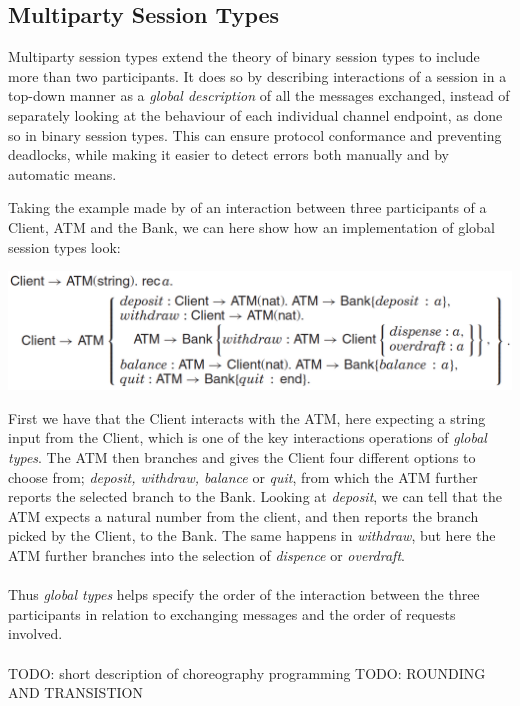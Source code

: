 
\subsection{Multiparty Session Types}
Multiparty session types extend the theory of binary session types to include more than two participants. It does so by describing interactions of a session in a top-down manner as a \textit{global description} of all the messages exchanged, instead of separately looking at the behaviour of each individual channel endpoint, as done so in binary session types. This can ensure protocol conformance and preventing deadlocks, while making it easier to detect errors both manually and by automatic means.  %

Taking the example made by \citeauthor{DBLP:journals/csur/HuttelLVCCDMPRT16} of an interaction between three participants of a Client, ATM and the Bank, we can here show how an implementation of global session types look:
\begin{center}
\includegraphics[width=1.0\textwidth, angle=0]{Graphics/Client_ATM.pdf}
\end{center}
First we have that the Client interacts with the ATM, here expecting a string input from the Client, which is one of the key interactions operations of \textit{global types}. The ATM then branches and gives the Client four different options to choose from; \textit{deposit, withdraw, balance} or \textit{quit}, from which the ATM further reports the selected branch to the Bank. Looking at \textit{deposit}, we can tell that the ATM expects a natural number from the client, and then reports the branch picked by the Client, to the Bank. The same happens in \textit{withdraw}, but here the ATM further branches into the selection of \textit{dispence} or \textit{overdraft}.
\\ \\
Thus \textit{global types} helps specify the order of the interaction between the three participants in relation to exchanging messages and the order of requests involved.  \\ \\
TODO: short description of choreography programming
TODO: ROUNDING AND TRANSISTION


